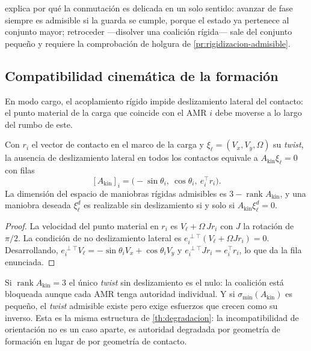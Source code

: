  explica por qué la conmutación es delicada en un solo
sentido: avanzar de fase siempre es admisible si la guarda se cumple, porque el
estado ya pertenece al conjunto mayor; retroceder —disolver una coalición
rígida— sale del conjunto pequeño y requiere la comprobación de holgura de
\cref{pr:rigidizacion-admisible}.

\subsection{Compatibilidad cinemática de la formación}

En modo \textsf{cargo}, el acoplamiento rígido impide deslizamiento lateral del
contacto: el punto material de la carga que coincide con el AMR $i$ debe moverse
a lo largo del rumbo de este.

\begin{proposicion}
\label{pr:rigidez}
Con $r_i$ el vector de contacto en el marco de la carga y
$\xi_\ell=(V_x,V_y,\Omega)$ su \emph{twist}, la ausencia de deslizamiento
lateral en todos los contactos equivale a $A_{\mathrm{kin}}\xi_\ell=0$ con filas
\[
  [A_{\mathrm{kin}}]_i=\bigl(-\sin\theta_i,\ \cos\theta_i,\ e_i^{\!\top}r_i\bigr).
\]
La dimensión del espacio de maniobras rígidas admisibles es
$3-\operatorname{rank}A_{\mathrm{kin}}$, y una maniobra deseada $\xi^d_\ell$ es
realizable sin deslizamiento si y solo si $A_{\mathrm{kin}}\xi^d_\ell=0$.
\end{proposicion}

\begin{proof}
La velocidad del punto material en $r_i$ es $V_\ell+\Omega\,Jr_i$ con $J$ la
rotación de $\pi/2$. La condición de no deslizamiento lateral es
$e_i^{\perp\top}(V_\ell+\Omega Jr_i)=0$. Desarrollando,
$e_i^{\perp\top}V_\ell=-\sin\theta_i V_x+\cos\theta_i V_y$ y
$e_i^{\perp\top}Jr_i=e_i^{\!\top}r_i$, lo que da la fila enunciada.
\end{proof}

\begin{observacion}
\label{obs:incompatible}
Si $\operatorname{rank}A_{\mathrm{kin}}=3$ el único \emph{twist} sin
deslizamiento es el nulo: la coalición está bloqueada aunque cada AMR tenga
autoridad individual. Y si $\sigma_{\min}(A_{\mathrm{kin}})$ es pequeño, el
\emph{twist} admisible existe pero exige esfuerzos que crecen como su inverso.
Esta es la misma estructura de \cref{th:degradacion}: la incompatibilidad de
orientación no es un caso aparte, es autoridad degradada por geometría de
formación en lugar de por geometría de contacto.
\end{observacion}

